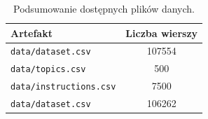 \begin{table}[htbp]
\centering
\caption{Podsumowanie dostępnych plików danych.}
\label{tab:dane-podsumowanie}
\begin{tabular}{lS}
\toprule
\textbf{Artefakt} & {\textbf{Liczba wierszy}} \\
\midrule
\texttt{data/dataset.csv} & 107554 \\
\texttt{data/topics.csv} & 500  \\
\texttt{data/instructions.csv} & 7500  \\
\texttt{data/dataset.csv} & 106262\\
\bottomrule
\end{tabular}
\end{table}
